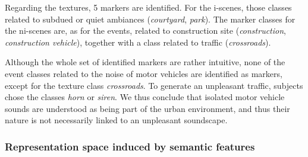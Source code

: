 \documentclass[12pt]{elsarticle}
\begin{document}

Regarding the textures, 5 markers are identified. For the i-scenes, those classes related to subdued or quiet ambiances (\emph{courtyard}, \emph{park}). The marker classes for the ni-scenes are, as for the events, related to construction site (\emph{construction}, \emph{construction vehicle}), together with a class related to traffic (\emph{crossroads}).


Although the whole set of identified markers are rather intuitive, none of the event classes related to the noise of motor vehicles are identified as markers, except for the texture class \emph{crossroads}. To generate an unpleasant traffic, subjects chose the classes \emph{horn} or \emph{siren}. We thus conclude that isolated motor vehicle sounds are understood as being part of the urban environment, and thus their nature is not necessarily linked to an unpleasant soundscape.

\subsubsection*{Representation space induced by semantic features}
\end{document}
